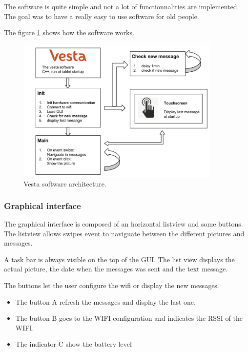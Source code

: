 The software is quite simple and not a lot of functionnalities are implemented. The goal was to have a really easy to use software for old people.

The figure \ref{fig:soft archi} shows how the software works.

\begin{figure}[!htb]
    \centering
    \includegraphics[width=0.9\textwidth,keepaspectratio]{chap/softFig/vesta_software_diagram2}
    \caption{Vesta software architecture.}
    \label{fig:soft archi}
\end{figure}

\subsubsection{Graphical interface}
The graphical interface is composed of an horizontal listview and some buttons. The listview allows swipes event to naviguate between the different pictures and messages.

A task bar is always visible on the top of the GUI. The list view displays the actual picture, the date when the messages was sent and the text message.

The buttons let the user configure the wifi or display the new messages.

\begin{itemize}
\item{The button A refresh the messages and display the last one.}
\item{The button B goes to the WIFI configuration and indicates the RSSI of the WIFI.}
\item{The indicator C show the battery level}
\end{itemize}

